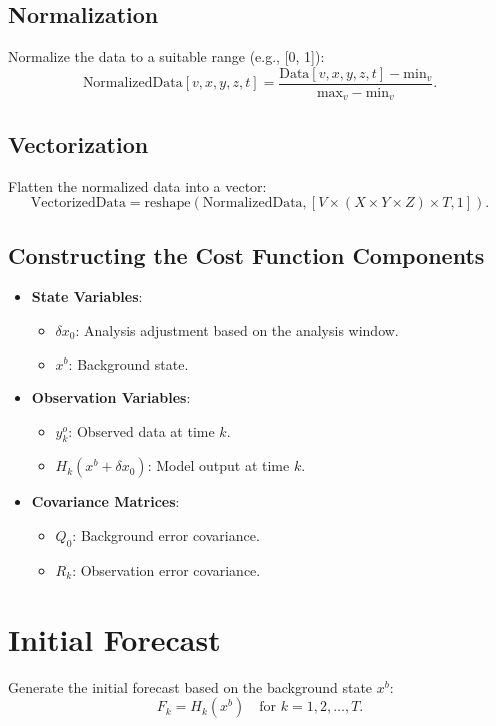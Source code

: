 \documentclass{article}
\begin{document}
\subsection{Normalization}
Normalize the data to a suitable range (e.g., [0, 1]):
\[
    \text{NormalizedData}[v, x, y, z, t] = \frac{\text{Data}[v, x, y, z, t] - \text{min}_v}{\text{max}_v - \text{min}_v}.
\]

\subsection{Vectorization}
Flatten the normalized data into a vector:
\[
    \text{VectorizedData} = \text{reshape}(\text{NormalizedData}, [V \times (X \times Y \times Z) \times T, 1]).
\]

\subsection{Constructing the Cost Function Components}
\begin{itemize}
    \item \textbf{State Variables}:
    \begin{itemize}
        \item \(\delta x_0\): Analysis adjustment based on the analysis window.
        \item \(x^b\): Background state.
    \end{itemize}
    
    \item \textbf{Observation Variables}:
    \begin{itemize}
        \item \(y_k^o\): Observed data at time \(k\).
        \item \(H_k(x^b + \delta x_0)\): Model output at time \(k\).
    \end{itemize}
    
    \item \textbf{Covariance Matrices}:
    \begin{itemize}
        \item \(Q_0\): Background error covariance.
        \item \(R_k\): Observation error covariance.
    \end{itemize}
\end{itemize}

\section{Initial Forecast}
Generate the initial forecast based on the background state \(x^b\):
\[
    F_k = H_k(x^b) \quad \text{for } k = 1, 2, \ldots, T.
\]
\end{document}
